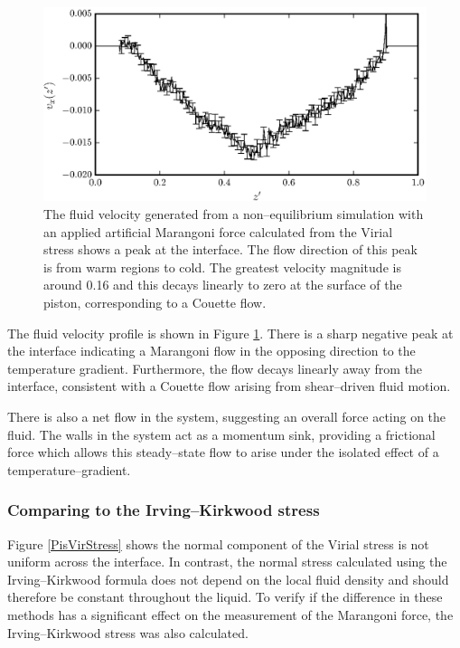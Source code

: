 \begin{figure}[h]
\centering
\includegraphics[scale=0.8]{PisVirFlow}
\caption{The fluid velocity generated from a non--equilibrium simulation with an applied artificial Marangoni force calculated from the Virial stress shows a peak at the interface.
The flow direction of this peak is from warm regions to cold.
The greatest velocity magnitude is around 0.16 and this decays linearly to zero at the surface of the piston, corresponding to a Couette flow.}
\label{PisVirFlow}
\end{figure}
The fluid velocity profile is shown in Figure \ref{PisVirFlow}. 
There is a sharp negative peak at the interface indicating a Marangoni flow in the opposing direction to the temperature gradient.
Furthermore, the flow decays linearly away from the interface, consistent with a Couette flow arising from shear--driven fluid motion.\cite{FluidMech}

There is also a net flow in the system, suggesting an overall force acting on the fluid.
The walls in the system act as a momentum sink, providing a frictional force which allows this steady--state flow to arise under the isolated effect of a temperature--gradient.
\FloatBarrier

\subsubsection{Comparing to the Irving--Kirkwood stress}
Figure \ref{PisVirStress} shows the normal component of the Virial stress is not uniform across the interface.
In contrast, the normal stress calculated using the Irving--Kirkwood formula does not depend on the local fluid density and should therefore be constant throughout the liquid.
To verify if the difference in these methods has a significant effect on the measurement of the Marangoni force, the Irving--Kirkwood stress was also calculated.

